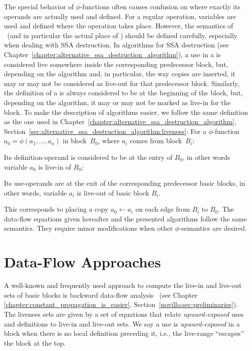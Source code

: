 The special behavior of $\phi$-functions often causes confusion on where exactly its operands are actually used and defined.
For a regular operation, variables are used and defined where the operation takes place.
However, the semantics of \phifuns\ (and in particular the actual place of \phiuses) should be defined carefully, especially when dealing with SSA destruction.
In algorithms for SSA destruction (see Chapter~\ref{chapter:alternative_ssa_destruction_algorithm}), a use in a \phifun is considered live somewhere inside the corresponding predecessor block, but, depending on the algorithm and, in particular, the way copies are inserted, it may or may not be considered as live-out for that predecessor block.
Similarly, the definition of a \phifun is always considered to be at the beginning of the block, but, depending on the algorithm, it may or may not be marked as live-in for the block.
To make the description of algorithms easier, we follow the same definition as the one used in Chapter~\ref{chapter:alternative_ssa_destruction_algorithm}, Section~\ref{sec:alternative_ssa_destruction_algorithm:liveness}:
For a $\phi$-function $a_0 = \phi(a_1, \ldots, a_n)$ in block~$B_0$, where $a_i$ comes from block~$B_i$:
\begin{compactitem}
\item
	Its definition-operand is considered to be at the entry of $B_0$, in other words variable $a_0$ is live-in of $B_0$;
\item
	Its use-operands are at the exit of the corresponding predecessor basic blocks, in other words, variable $a_i$ is live-out of basic block $B_i$.
\end{compactitem}
This corresponds to placing a copy $a_0\gets a_i$ on each edge from $B_i$ to $B_0$.
The data-flow equations given hereafter and the presented algorithms follow the same semantics.
They require minor modifications when other $\phi$-semantics are desired.

\section{Data-Flow Approaches}
\label{sec:data-flow}

A well-known and frequently used approach to compute the live-in and live-out sets of basic blocks is backward data-flow analysis~ (see Chapter \ref{chapter:constant_propagation_is_easier}, Section~\ref{novillo:sec:preliminaries}).
The liveness sets are given by a set of equations that relate \emph{upward-exposed} uses and definitions to live-in and live-out sets.
We say a use is \emph{upward-exposed} in a block when there is no local definition preceding it, i.e., the live-range ``escapes'' the block at the top.

